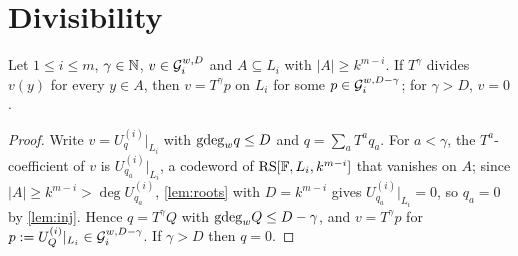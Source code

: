 \section{Divisibility}

\begin{lemma}[Divisibility]\label{lem:div}
Let $1\le i\le m$, $\gamma\in\mathbb{N}$, $v\in\mathcal{G}_i^{w,D}$ and $A\subseteq L_i$ with $|A|\ge k^{m-i}$.
If $T^\gamma$ divides $v(y)$ for every $y\in A$, then $v=T^\gamma p$ on $L_i$ for some
$p\in\mathcal{G}_i^{w,D-\gamma}$; for $\gamma>D$, $v=0$.
\end{lemma}

\begin{proof}
Write $v=U^{(i)}_q|_{L_i}$ with $\mathrm{gdeg}_w q\le D$ and $q=\sum_aT^aq_a$. For $a<\gamma$, the
$T^a$-coefficient of $v$ is $U^{(i)}_{q_a}|_{L_i}$, a codeword of $\mathrm{RS}[\mathbb{F},L_i,k^{m-i}]$ that
vanishes on $A$; since $|A|\ge k^{m-i}>\deg U^{(i)}_{q_a}$, \cref{lem:roots} with $D=k^{m-i}$
gives $U^{(i)}_{q_a}|_{L_i}=0$, so $q_a=0$ by \cref{lem:inj}. Hence $q=T^\gamma Q$ with $\mathrm{gdeg}_w Q\le D-\gamma$, and $v=T^\gamma p$ for
$p:=U^{(i)}_Q|_{L_i}\in\mathcal{G}_i^{w,D-\gamma}$. If $\gamma>D$ then $q=0$.
\end{proof}
